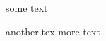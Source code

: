 \documentclass{article}
\begin{document}
some text
\begin{filecontents*}{another.tex}
	more text
\end{filecontents*}
\end{document}
